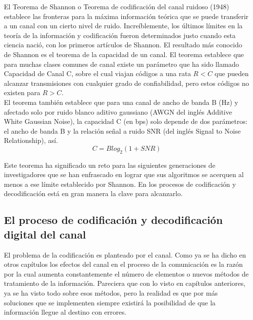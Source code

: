El Teorema de Shannon o Teorema de codificación del canal ruidoso (1948) establece las fronteras para la máxima información teórica que se puede transferir a un canal con un cierto nivel de ruido. Increíblemente, los últimos límites en la teoría de la información y codificación fueron determinados justo cuando esta ciencia nació, con los primeros artículos de Shannon. El resultado más conocido de Shannon es el teorema de la capacidad de un canal. El teorema establece que para muchas clases comunes de canal existe un parámetro que ha sido llamado Capacidad de Canal C, sobre el cual viajan códigos a una rata $R < C$ que pueden alcanzar transmisiones con cualquier grado de confiabilidad, pero estos códigos no existen para $R > C$.\\

El teorema también establece que para una canal de ancho de banda B (Hz) y afectado solo por ruido blanco aditivo gaussiano (AWGN del inglés Additive White Gaussian Noise), la capacidad C (en bps) solo depende de dos parámetros: el ancho de banda B y la relación señal a ruido SNR (del inglés Signal to Noise Relationship), así.\\

\begin{equation} \label{capseis_uno}
	C= Blog_2(1+SNR)
\end{equation}

Este teorema ha significado un reto para las siguientes generaciones de investigadores que se han enfrascado en lograr que sus algoritmos se acerquen al menos a ese límite establecido por Shannon. En los procesos de codificación y decodificación está en gran manera la clave para alcanzarlo. \\

\subsection{El proceso de codificación y decodificación digital del canal}

El problema de la codificación es planteado por el canal. Como ya  se ha dicho en otros capítulos los efectos del canal en el proceso de la comunicación es la razón por la cual aumenta constantemente el número de elementos o nuevos métodos de tratamiento de la información. Pareciera que con lo visto en capítulos anteriores, ya se ha visto todo sobre esos métodos, pero la realidad es que por más soluciones que se implementen siempre existirá la posibilidad de que la información llegue al destino con errores.\\

